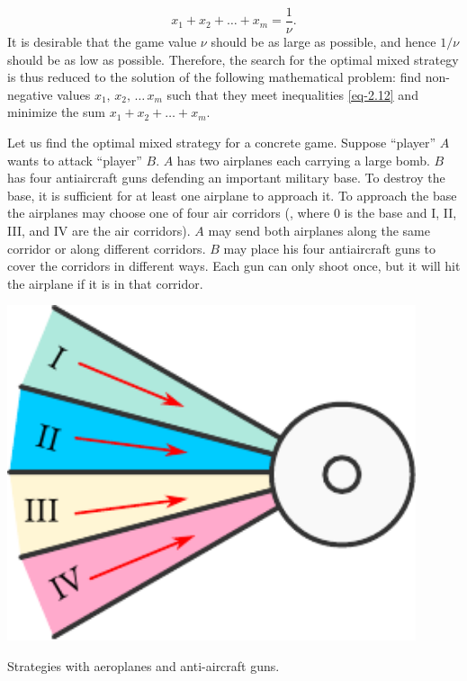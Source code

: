 \begin{equation}%
x_{1} + x_{2}+ \ldots + x_{m} = \frac{1}{\nu}. 
\label{eq-2.13}
\end{equation}
It is desirable that the game value $\nu$ should be as large as possible,
and hence $1/\nu$ should be as low as possible. Therefore, the search for the
optimal mixed strategy is thus reduced to the solution of the following
mathematical problem: find non-negative values $x_{1}, \, x_{2}, \, \ldots \, x_{m}$ such that they meet inequalities \eqref{eq-2.12} and minimize the sum $x_{1} + x_{2}+ \ldots{} + x_{m}$.

 Let us find the optimal mixed
strategy for a concrete game. Suppose ``player'' $A$ wants to attack
``player'' $B$. $A$ has two airplanes each carrying a large bomb. $B$ has four
antiaircraft guns defending an important military base. To destroy the
base, it is sufficient for at least one airplane to approach it. To approach
the base the airplanes may choose one of four air corridors (, where 0 is the base and I, II, III, and IV are the air corridors). $A$ may send both airplanes along the same corridor or along different corridors. $B$ may place his four antiaircraft guns to cover the corridors in different ways. Each gun can only shoot once, but it will hit the airplane if it is in that corridor.
 \begin{marginfigure}[-4cm]%
 \centering
 \includegraphics[width=0.9\textwidth]{figures/anti-aircraft.pdf}
\caption{Strategies with aeroplanes and anti-aircraft guns.\label{anti-aircraft}}
 \end{marginfigure}
 
